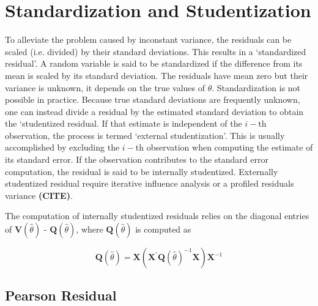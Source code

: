 \documentclass[12pt, a4paper]{report}
\theoremstyle{plain}
\theoremstyle{definition}
\theoremstyle{remark}
\begin{document}







\section{Standardization and Studentization} %
To alleviate the problem caused by inconstant variance, the residuals can be scaled (i.e. divided) by their standard deviations. This results in a `standardized residual'. A random variable is said to be standardized if the difference from its mean is scaled by its standard deviation. The residuals  have mean zero but their variance is unknown, it depends on the true values of $\theta$. Standardization is  not possible in practice. Because true standard deviations are frequently unknown, one can instead divide a residual by the estimated standard deviation to obtain the `studentized residual. 
If that estimate is independent of the $i-$th observation, the process is termed `external studentization'. This is usually accomplished by excluding the $i-$th observation when computing the estimate of its standard error. If the observation contributes to the
standard error computation, the residual is said to be internally studentized.
Externally  studentized residual require iterative influence analysis or a profiled residuals variance \textbf{(CITE)}.



The computation of internally studentized residuals relies on the diagonal entries of $\boldsymbol{V} (\hat{\theta})$ - $\boldsymbol{Q} (\hat{\theta})$, where $\boldsymbol{Q} (\hat{\theta})$ is computed as

\[ \boldsymbol{Q} (\hat{\theta}) = \boldsymbol{X} ( \boldsymbol{X}^{\prime}\boldsymbol{Q} (\hat{\theta})^{-1}\boldsymbol{X})\boldsymbol{X}^{-1} \]


\subsection{Pearson Residual}%
\end{document}

